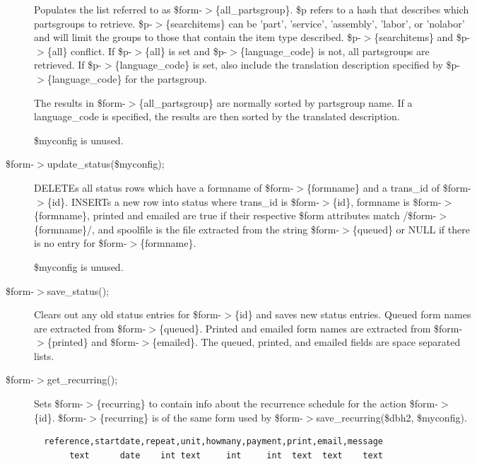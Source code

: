 \begin{description}
\begin{description}
\begin{description}
\begin{description}
\begin{description}
\begin{description}
Populates the list referred to as \$form-$>$\{all\_partsgroup\}.  \$p refers to a hash
that describes which partsgroups to retrieve.  \$p-$>$\{searchitems\} can be 'part',
'service', 'assembly', 'labor', or 'nolabor' and will limit the groups to those
that contain the item type described.  \$p-$>$\{searchitems\} and \$p-$>$\{all\} conflict.
If \$p-$>$\{all\} is set and \$p-$>$\{language\_code\} is not, all partsgroups are
retrieved.  If \$p-$>$\{language\_code\} is set, also include the translation
description specified by \$p-$>$\{language\_code\} for the partsgroup.



The results in \$form-$>$\{all\_partsgroup\} are normally sorted by partsgroup name.
If a language\_code is specified, the results are then sorted by the translated
description.



\$myconfig is unused.


\item[{\$form-$>$update\_status(\$myconfig);}] \mbox{}

DELETEs all status rows which have a formname of \$form-$>$\{formname\} and a 
trans\_id of \$form-$>$\{id\}.  INSERTs a new row into status where trans\_id is
\$form-$>$\{id\}, formname is \$form-$>$\{formname\}, printed and emailed are true if
their respective \$form attributes match /\$form-$>$\{formname\}/, and spoolfile is
the file extracted from the string \$form-$>$\{queued\} or NULL if there is no entry
for \$form-$>$\{formname\}.



\$myconfig is unused.


\item[{\$form-$>$save\_status();}] \mbox{}

Clears out any old status entries for \$form-$>$\{id\} and saves new status entries.
Queued form names are extracted from \$form-$>$\{queued\}.  Printed and emailed form
names are extracted from \$form-$>$\{printed\} and \$form-$>$\{emailed\}.  The queued,
printed, and emailed fields are space separated lists.


\item[{\$form-$>$get\_recurring();}] \mbox{}

Sets \$form-$>$\{recurring\} to contain info about the recurrence schedule for the
action \$form-$>$\{id\}.  \$form-$>$\{recurring\} is of the same form used by
\$form-$>$save\_recurring(\$dbh2, \$myconfig).

\begin{verbatim}
  reference,startdate,repeat,unit,howmany,payment,print,email,message
       text      date    int text     int     int  text  text    text
\end{verbatim}


\end{description}
\end{description}
\end{description}
\end{description}
\end{description}
\end{description}
